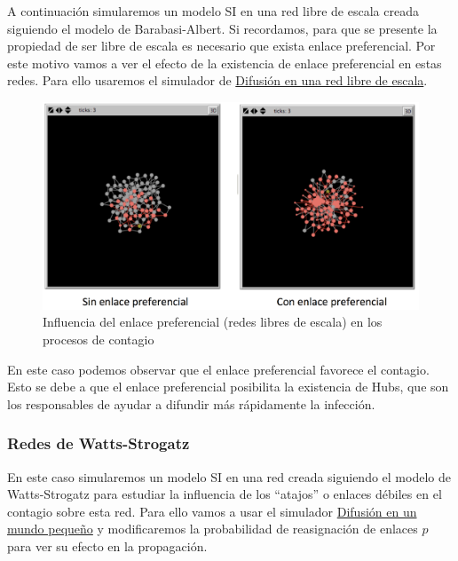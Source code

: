\documentclass[]{article}
\begin{document}
A continuación simularemos un modelo SI en una red libre de escala
creada siguiendo el modelo de Barabasi-Albert. Si recordamos, para que
se presente la propiedad de ser libre de escala es necesario que exista
enlace preferencial. Por este motivo vamos a ver el efecto de la
existencia de enlace preferencial en estas redes. Para ello usaremos el
simulador de
\href{http://www.ladamic.com/netlearn/NetLogo501/BADiffusion.html}{Difusión
en una red libre de escala}.

\begin{figure}[htbp]
\centering
\includegraphics{../images/tema08/contagioBA.png}
\caption{Influencia del enlace preferencial (redes libres de escala) en
los procesos de contagio}
\end{figure}

En este caso podemos observar que el enlace preferencial favorece el
contagio. Esto se debe a que el enlace preferencial posibilita la
existencia de Hubs, que son los responsables de ayudar a difundir más
rápidamente la infección.

\subsubsection{Redes de Watts-Strogatz}\label{redes-de-watts-strogatz}

En este caso simularemos un modelo SI en una red creada siguiendo el
modelo de Watts-Strogatz para estudiar la influencia de los ``atajos'' o
enlaces débiles en el contagio sobre esta red. Para ello vamos a usar el
simulador
\href{http://www.ladamic.com/netlearn/NetLogo4/SmallWorldDiffusionSIS.html}{Difusión
en un mundo pequeño} y modificaremos la probabilidad de reasignación de
enlaces \(p\) para ver su efecto en la propagación.
\end{document}
